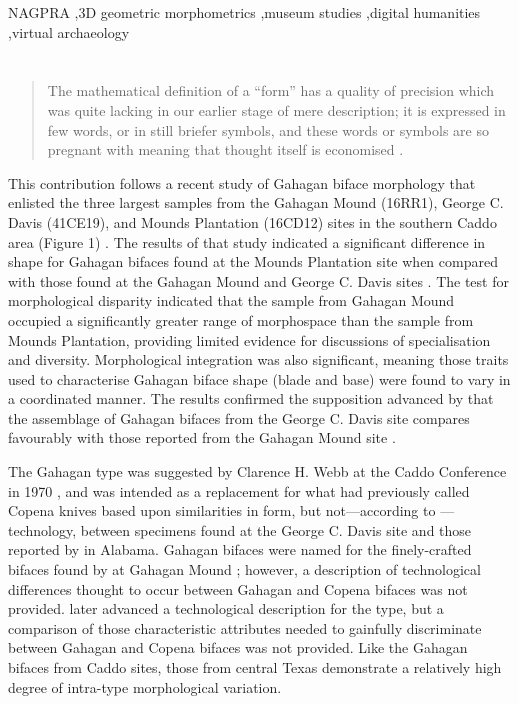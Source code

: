 \documentclass[review]{elsarticle}
\begin{document}
\begin{frontmatter}
\begin{keyword}
NAGPRA \sep 3D geometric morphometrics \sep museum studies \sep digital humanities \sep virtual archaeology
\end{keyword}

\end{frontmatter}

\linenumbers

\section*{}

\begin{quote}
The mathematical definition of a ``form'' has a quality of precision which was quite lacking in our earlier stage of mere description; it is expressed in few words, or in still briefer symbols, and these words or symbols are so pregnant with meaning that thought itself is economised \citep[720-721]{RN11532}.    
\end{quote}

This contribution follows a recent study of Gahagan biface morphology that enlisted the three largest samples from the Gahagan Mound (16RR1), George C. Davis (41CE19), and Mounds Plantation (16CD12) sites in the southern Caddo area (Figure 1) \citep{RN11783}. The results of that study indicated a significant difference in shape for Gahagan bifaces found at the Mounds Plantation site when compared with those found at the Gahagan Mound and George C. Davis sites \citep[Figure 7]{RN11783}. The test for morphological disparity indicated that the sample from Gahagan Mound occupied a significantly greater range of morphospace than the sample from Mounds Plantation, providing limited evidence for discussions of specialisation and diversity. Morphological integration was also significant, meaning those traits used to characterise Gahagan biface shape (blade and base) were found to vary in a coordinated manner. The results confirmed the supposition advanced by \cite{RN3684} that the assemblage of Gahagan bifaces from the George C. Davis site compares favourably with those reported from the Gahagan Mound site \citep{RN5274,RN2740}.

The Gahagan type was suggested by Clarence H. Webb at the Caddo Conference in 1970 \citep{RN3684}, and was intended as a replacement for what \cite{RN800} had previously called Copena knives based upon similarities in form, but not---according to \cite{RN3684}---technology, between specimens found at the George C. Davis site and those reported by \cite{RN11562} in Alabama. Gahagan bifaces were named for the finely-crafted bifaces found by \cite{RN2740} at Gahagan Mound \citep{RN3684}; however, a description of technological differences thought to occur between Gahagan and Copena bifaces was not provided. \citet[22]{RN4924} later advanced a technological description for the type, but a comparison of those characteristic attributes needed to gainfully discriminate between Gahagan and Copena bifaces was not provided. Like the Gahagan bifaces from Caddo sites, those from central Texas demonstrate a relatively high degree of intra-type morphological variation. 
\end{document}

